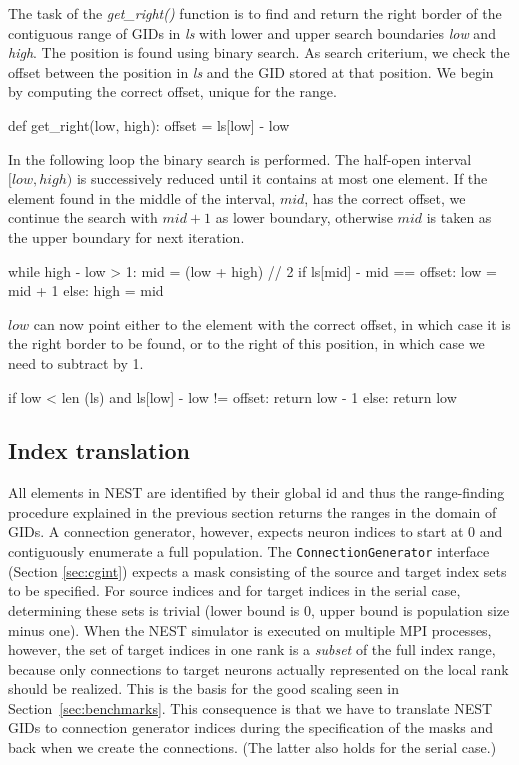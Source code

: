 \documentclass{frontiersSCNS} %
\begin{document}
The task of the \emph{get\_right()} function is to find and return the
right border of the contiguous range of GIDs in \emph{ls} with lower
and upper search boundaries \emph{low} and \emph{high}. The position
is found using binary search. As search criterium, we check the offset
between the position in \emph{ls} and the GID stored at that
position. We begin by computing the correct offset, unique for the
range.

\begin{pythoncode}
def get_right(low, high):
    offset = ls[low] - low
\end{pythoncode}

In the following loop the binary search is performed. The half-open
interval $[low, high)$ is successively reduced until it contains at
most one element. If the element found in the middle of the
interval, $mid$, has the correct offset, we continue the search with
$mid + 1$ as lower boundary, otherwise $mid$ is taken as the upper
boundary for next iteration.

\begin{pythoncode}
    while high - low > 1:
        mid = (low + high) // 2
        if ls[mid] - mid == offset:
            low = mid + 1
        else:
            high = mid
\end{pythoncode}

$low$ can now point either to the element with the correct offset, in
which case it is the right border to be found, or to the right of this
position, in which case we need to subtract by 1.

\begin{pythoncode}
    if low < len (ls) and ls[low] - low != offset:
        return low - 1
    else:
        return low
\end{pythoncode}

\subsection*{Index translation}

All elements in NEST are identified by their global id and thus the
range-finding procedure explained in the previous section returns the
ranges in the domain of GIDs. A connection generator, however, expects
neuron indices to start at 0 and contiguously enumerate a full
population.  The \verb|ConnectionGenerator| interface (Section
\ref{sec:cgint}) expects a mask consisting of the source and target
index sets to be specified.  For source indices and for target indices
in the serial case, determining these sets is trivial (lower bound is
0, upper bound is population size minus one).  When the NEST simulator
is executed on multiple MPI processes, however, the set of target
indices in one rank is a \emph{subset} of the full index range,
because only connections to target neurons actually represented on the
local rank should be realized. This is the basis for the good scaling
seen in Section~\ref{sec:benchmarks}.  This consequence is that we
have to translate NEST GIDs to connection generator indices during the
specification of the masks and back when we create the
connections. (The latter also holds for the serial case.)
\end{document}

